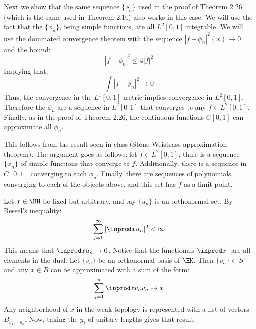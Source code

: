 Next we show that the same sequence $\{\phi_n\}$ used in the proof of Theorem 2.26 (which is the same used in Theorem 2.10) also works in this case. 
We will use the fact that the $\{\phi_n\}$, being simple functions,  are all $L^2[0,1]$ integrable. 
We will use the dominated convergence theorem with the sequence $|f-\phi_n|^2(x) \to 0$ and the bound:
$$|f-\phi_n|^2\leq 4|f|^2$$
Implying that:
$$\int |f-\phi_n|^2 \to 0$$
Thus, the convergence in the $L^1[0,1]$ metric implies convergence in $L^2[0,1]$. Therefore the $\phi_n$ are a sequence in $L^2[0,1]$ that converges to any $f\in L^2[0,1]$. Finally, as in the proof of Theorem 2.26, the continuous functions $C[0,1]$ can approximate all $\phi_n$. 

This follows from the result seen in class (Stone-Weistrass approximation theorem). The argument goes as follows: let $f\in L^2[0,1]$; there is a sequence $\{\phi_n\}$ of simple functions that converge to $f$. Additionally, there is a sequence in $C[0,1]$ converging to each $\phi_n$. Finally, there are sequences of polynomials converging to each of the objects above, and this set has $f$ as a limit point.

Let $x\in \HH$ be fixed but arbitrary, and say $\{u_n\}$ is an orthonormal set. By Bessel's inequality:
$$\sum_{j=1}^\infty |\inprod x{u_n}|^2 < \infty$$
This means that $\inprod x{u_n}\to 0$. Notice that the functionals $\inprod x\cdot$ are all elements in the dual.
Let $\{v_n\}$ be an orthonormal basis of $\HH$. Then $\{v_n\}\subset S$ and any $x\in B$ can be approximated with a sum of the form:
$$\sum_{j=1}^n \inprod x{v_n}v_n \to x$$
Any neighborhood of $x$ in the weak topology is represented with a list of vectors $B_{y_1,\ldots y_k}$. Now, taking the $y_i$ of unitary lengths gives that result.
